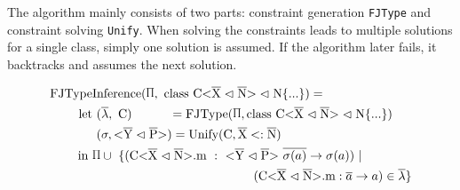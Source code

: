 The algorithm mainly consists of two parts: constraint generation \verb|FJType| and constraint solving \verb|Unify|.
When solving the constraints leads to multiple solutions for a single class, simply one solution is assumed. If the algorithm later fails, it backtracks and assumes the next solution.

\begin{align*}
    \text{FJType}&\text{Inference}(\sprod{0.7}, \ \classheader \{ ... \}) = \\
    \text{let} & \ (\overline{\lambda}, \ \text{C}) \quad \quad \quad = \text{FJType}(\sprod{0.7}, \classheader \{ ... \}) \\
    & \ (\sigma, \yp) = \text{Unify}(\text{C}, \overline{\text{X}} <: \overline{\text{N}}) \\
    \text{in} \ & \sprod{0.7} \cup \ \{( \cm \ : \ \yp \ \oto{\sigma(a)}) \ | \\
    & \quad \quad \quad \quad \quad \quad \quad \quad \quad \quad \quad \quad \quad (\cm : \oto{a} ) \in \overline{\lambda} \}
\end{align*}
